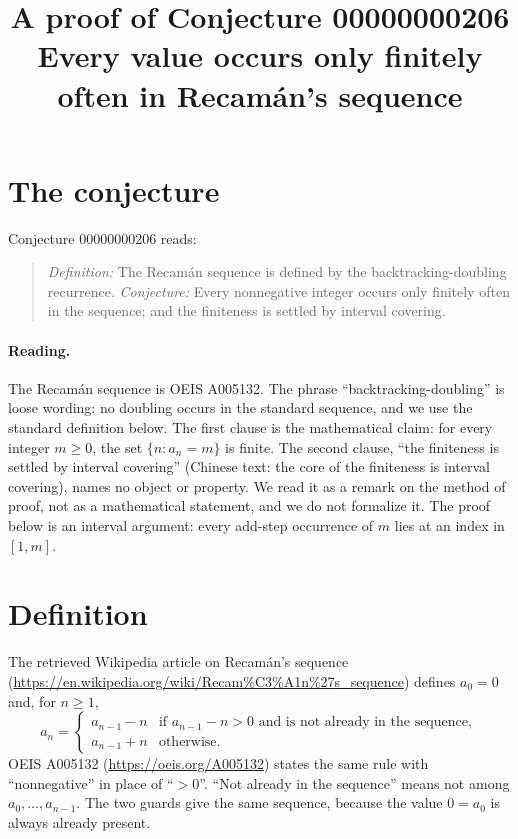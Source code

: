 \documentclass[11pt]{article}
\title{A proof of Conjecture 00000000206\\[2pt]
\large Every value occurs only finitely often in Recam\'an's sequence}
\date{}
\theoremstyle{definition}
\theoremstyle{remark}
\renewcommand{\_}{\oldus\allowbreak}
\begin{document}
\sloppy
\maketitle

\section{The conjecture}

Conjecture 00000000206 reads:

\begin{quote}
\emph{Definition:} The Recam\'an sequence is defined by the backtracking-doubling recurrence.
\emph{Conjecture:} Every nonnegative integer occurs only finitely often in the sequence; and the
finiteness is settled by interval covering.
\end{quote}

\paragraph{Reading.} The Recam\'an sequence is OEIS A005132. The phrase ``backtracking-doubling'' is
loose wording: no doubling occurs in the standard sequence, and we use the standard definition below.
The first clause is the mathematical claim: for every integer $m \ge 0$, the set $\{n : a_n = m\}$ is
finite. The second clause, ``the finiteness is settled by interval covering'' (Chinese text: the core of
the finiteness is interval covering), names no object or property. We read it as a remark on the method
of proof, not as a mathematical statement, and we do not formalize it. The proof below is an interval
argument: every add-step occurrence of $m$ lies at an index in $[1, m]$.

\section{Definition}

The retrieved Wikipedia article on Recam\'an's sequence
(\url{https://en.wikipedia.org/wiki/Recam%C3%A1n%27s_sequence}) defines $a_0 = 0$ and, for $n \ge 1$,
\[
a_n = \begin{cases} a_{n-1} - n & \text{if } a_{n-1} - n > 0 \text{ and is not already in the sequence},\\
a_{n-1} + n & \text{otherwise.}\end{cases}
\]
OEIS A005132 (\url{https://oeis.org/A005132}) states the same rule with ``nonnegative'' in place of
``$> 0$''. ``Not already in the sequence'' means not among $a_0, \dots, a_{n-1}$. The two guards give the
same sequence, because the value $0 = a_0$ is always already present.
\end{document}
